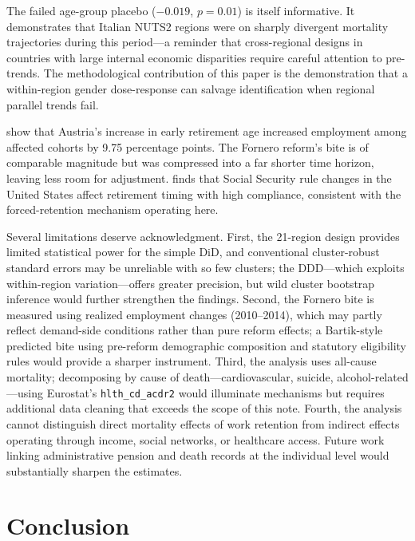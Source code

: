\documentclass[12pt]{article}
\begin{document}
The failed age-group placebo ($-0.019$, $p = 0.01$) is itself informative. It demonstrates that Italian NUTS2 regions were on sharply divergent mortality trajectories during this period---a reminder that cross-regional designs in countries with large internal economic disparities require careful attention to pre-trends. The methodological contribution of this paper is the demonstration that a within-region gender dose-response can salvage identification when regional parallel trends fail.

\citet{staubli2013} show that Austria's increase in early retirement age increased employment among affected cohorts by 9.75 percentage points. The Fornero reform's bite is of comparable magnitude but was compressed into a far shorter time horizon, leaving less room for adjustment. \citet{mastrobuoni2009} finds that Social Security rule changes in the United States affect retirement timing with high compliance, consistent with the forced-retention mechanism operating here.

Several limitations deserve acknowledgment. First, the 21-region design provides limited statistical power for the simple DiD, and conventional cluster-robust standard errors may be unreliable with so few clusters; the DDD---which exploits within-region variation---offers greater precision, but wild cluster bootstrap inference would further strengthen the findings. Second, the Fornero bite is measured using realized employment changes (2010--2014), which may partly reflect demand-side conditions rather than pure reform effects; a Bartik-style predicted bite using pre-reform demographic composition and statutory eligibility rules would provide a sharper instrument. Third, the analysis uses all-cause mortality; decomposing by cause of death---cardiovascular, suicide, alcohol-related---using Eurostat's \texttt{hlth\_cd\_acdr2} would illuminate mechanisms but requires additional data cleaning that exceeds the scope of this note. Fourth, the analysis cannot distinguish direct mortality effects of work retention from indirect effects operating through income, social networks, or healthcare access. Future work linking administrative pension and death records at the individual level would substantially sharpen the estimates.

\section{Conclusion}
\end{document}
